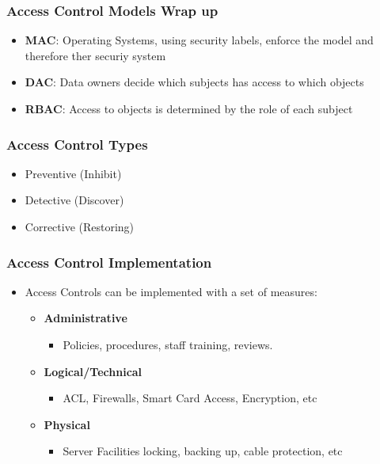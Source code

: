\documentclass{beamer}
\begin{document}
\begin{frame}
\frametitle{Access Control Models Wrap up}

\begin{itemize}
\item {\bf MAC}: Operating Systems, using security labels, enforce the model and therefore ther securiy system
\item {\bf DAC}: Data owners decide which subjects has access to which objects
\item {\bf RBAC}: Access to objects is determined by the role of each subject
\end{itemize}

\end{frame}


\begin{frame}
\frametitle{Access Control Types}

\begin{itemize}
\item Preventive (Inhibit)
\item Detective (Discover)
\item Corrective (Restoring)
\end{itemize}

\end{frame}

\begin{frame}
\frametitle{Access Control Implementation}

\begin{itemize}
\item Access Controls can be implemented with a set of measures:
\begin{itemize}
\item {\bf Administrative}
    \begin{itemize}
    \item Policies, procedures, staff training, reviews.
    \end{itemize}
\item {\bf Logical/Technical}
    \begin{itemize}
    \item ACL, Firewalls, Smart Card Access, Encryption, etc
    \end{itemize}
\item {\bf Physical}
    \begin{itemize}
    \item Server Facilities locking, backing up, cable protection, etc
    \end{itemize}
\end{itemize}
\end{itemize}

\end{frame}
\end{document}
